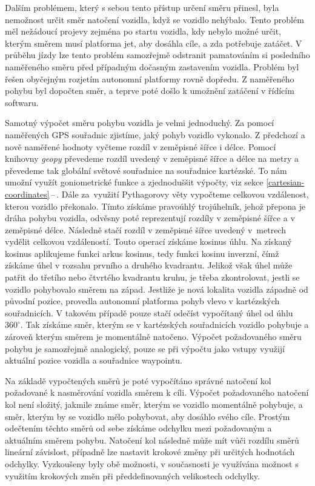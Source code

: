 \documentclass[czech, bachelor]{diploma}
\newcommand{\peteref}[1]{\ref{#1}\,--\,\nameref{#1}}
\begin{document}
Dalším problémem, který s sebou tento přístup určení směru přinesl, byla nemožnost určit směr natočení vozidla, když se vozidlo
nehýbalo. Tento problém měl nežádoucí projevy zejména po startu vozidla, kdy nebylo možné určit, kterým směrem musí platforma jet,
aby dosáhla cíle, a zda potřebuje zatáčet. V průběhu jízdy lze tento problém samozřejmě odstranit pamatováním si posledního
naměřeného směru před případným dočasným zastavením vozidla. Problém byl řešen obyčejným rozjetím autonomní platformy rovně
dopředu. Z naměřeného pohybu byl dopočten směr, a teprve poté došlo k umožnění zatáčení v řídícím softwaru.

Samotný výpočet směru pohybu vozidla je velmi jednoduchý. Za pomocí naměřených GPS souřadnic zjistíme, jaký pohyb vozidlo
vykonalo. Z předchozí a nově naměřené hodnoty vyčteme rozdíl v zeměpisné šířce i délce. Pomocí knihovny \emph{geopy} převedeme
rozdíl uvedený v zeměpisné šířce a délce na metry a převedeme tak globální světové souřadnice na souřadnice kartézské. To nám
umožní využít goniometrické funkce a zjednoduššit výpočty, viz sekce \peteref{cartesian-coordinates}. Dále za~využití Pythagorovy
věty vypočteme celkovou vzdálenost, kterou vozidlo překonalo. Tímto získáme pravoúhlý trojúhelník, jehož přepona je dráha
pohybu vozidla, odvěsny poté reprezentují rozdíly v zeměpisné šířce a v zeměpisné délce. Následně stačí rozdíl v zeměpisné šířce
uvedený v~metrech vydělit celkovou vzdáleností. Touto operací získáme kosinus úhlu. Na získaný kosinus aplikujeme funkci arkus
kosinus, tedy funkci kosinu inverzní, čímž získáme úhel v rozsahu prvního a druhého kvadrantu. Jelikož však úhel může patřit do
třetího nebo čtvrtého kvadrantu kruhu, je třeba zkontrolovat, jestli se vozidlo pohybovalo směrem na západ. Jestliže je nová
lokalita vozidla západně od původní pozice, provedla autonomní platforma pohyb vlevo v kartézských souřadnicích. V takovém případě
pouze stačí odečíst vypočítaný úhel od úhlu $360^{\circ}$. Tak získáme směr, kterým se v kartézských souřadnicích vozidlo pohybuje
a zároveň kterým směrem je momentálně natočeno. Výpočet požadovaného směru pohybu je samozřejmě analogický, pouze se při výpočtu
jako vstupy využijí aktuální pozice vozidla a souřadnice waypointu.

Na základě vypočtených směrů je poté vypočítáno správné natočení kol požadované k nasměrování vozidla směrem k cíli. Výpočet
požadovaného natočení kol není složitý, jakmile známe směr, kterým se vozidlo momentálně pohybuje, a směr, kterým by se vozidlo
mělo pohybovat, aby dosáhlo svého cíle. Prostým odečtením těchto směrů od sebe získáme odchylku mezi požadovaným a aktuálním
směrem pohybu. Natočení kol následně může mít vůči rozdílu směrů lineární závislost, případně lze nastavit krokové změny
při určitých hodnotách odchylky. Vyzkoušeny byly obě možnosti, v současnosti je využívána možnost s využitím krokových změn při
předdefinovaných velikostech odchylky.
\end{document}

